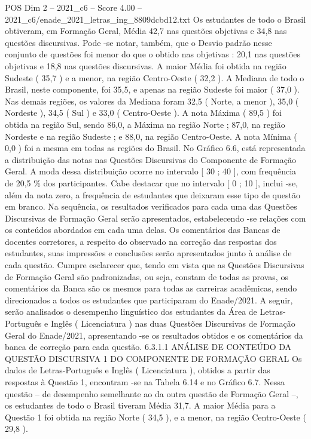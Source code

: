 \begin{textsample}{POS Dim 2 – 2021\_c6 – Score 4.00 – 2021\_c6/enade\_2021\_letras\_ing\_8809dcbd12.txt}
Os estudantes de todo o Brasil obtiveram, em Formação Geral, Média 42,7 nas questões objetivas e 34,8 nas questões discursivas.
Pode -se notar, também, que o Desvio padrão nesse conjunto de questões foi menor do que o obtido nas objetivas : 20,1 nas questões objetivas e 18,8 nas questões discursivas.
A maior Média foi obtida na região Sudeste ( 35,7 ) e a menor, na região Centro-Oeste ( 32,2 ).
A Mediana de todo o Brasil, neste componente, foi 35,5, e apenas na região Sudeste foi maior ( 37,0 ).
Nas demais regiões, os valores da Mediana foram 32,5 ( Norte, a menor ), 35,0 ( Nordeste ), 34,5 ( Sul ) e 33,0 ( Centro-Oeste ).
A nota Máxima ( 89,5 ) foi obtida na região Sul, sendo 86,0, a Máxima na região Norte ; 87,0, na região Nordeste e na região Sudeste ; e 88,0, na região Centro-Oeste.
A nota Mínima ( 0,0 ) foi a mesma em todas as regiões do Brasil.
No Gráfico 6.6, está representada a distribuição das notas nas Questões Discursivas do Componente de Formação Geral.
A moda dessa distribuição ocorre no intervalo [ 30 ; 40 ], com frequência de 20,5 \% dos participantes.
Cabe destacar que no intervalo [ 0 ; 10 ], inclui -se, além da nota zero, a frequência de estudantes que deixaram esse tipo de questão em branco.
Na sequência, os resultados verificados para cada uma das Questões Discursivas de Formação Geral serão apresentados, estabelecendo -se relações com os conteúdos abordados em cada uma delas.
Os comentários das Bancas de docentes corretores, a respeito do observado na correção das respostas dos estudantes, suas impressões e conclusões serão apresentados junto à análise de cada questão.
Cumpre esclarecer que, tendo em vista que as Questões Discursivas de Formação Geral são padronizadas, ou seja, constam de todas as provas, os comentários da Banca são os mesmos para todas as carreiras acadêmicas, sendo direcionados a todos os estudantes que participaram do Enade/2021.
A seguir, serão analisados o desempenho linguístico dos estudantes da Área de Letras-Português e Inglês ( Licenciatura ) nas duas Questões Discursivas de Formação Geral do Enade/2021, apresentando -se os resultados obtidos e os comentários da banca de correção para cada questão. 6.3.1.1 ANÁLISE DE CONTEÚDO DA QUESTÃO DISCURSIVA 1 DO COMPONENTE DE FORMAÇÃO GERAL Os dados de Letras-Português e Inglês ( Licenciatura ), obtidos a partir das respostas à Questão 1, encontram -se na Tabela 6.14 e no Gráfico 6.7.
Nessa questão – de desempenho semelhante ao da outra questão de Formação Geral –, os estudantes de todo o Brasil tiveram Média 31,7.
A maior Média para a Questão 1 foi obtida na região Norte ( 34,5 ), e a menor, na região Centro-Oeste ( 29,8 ).

\end{textsample}
